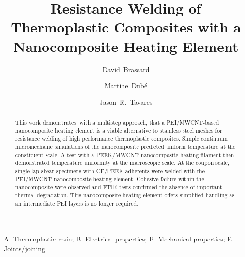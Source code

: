 \documentclass[11pt,review,times]{elsarticle}
\begin{document}


\title{Resistance Welding of Thermoplastic Composites with a Nanocomposite Heating Element}

\author[polymtl,crepec]{David~Brassard}
\author[ets,crepec]{Martine~Dubé}
\author[polymtl,crepec]{Jason~R.~Tavares}


\address[polymtl]{Department of Chemical Engineering, Polytechnique Montréal, P.O. Box 6079 Station Centre-Ville, Montréal, QC, H3C 3A7, Canada}
\address[ets]{Department of Mechanical Engineering, École de technologie supérieure, 1100 Notre-Dame Street West, Montréal, Québec, Canada, H3C 1K3}
\address[crepec]{Research Center for High Performance Polymer and Composite Systems (CREPEC), Polytechnique Montréal, P.O. Box 6079 Station Centre-Ville, Montréal, QC, H3C 3A7, Canada}

\begin{abstract}

This work demonstrates, with a multistep approach, that a PEI/MWCNT-based nanocomposite heating element is a viable alternative to stainless steel meshes for resistance welding of high performance thermoplastic composites. 
Simple continuum micromechanic simulations of the nanocomposite predicted uniform temperature at the constituent scale. 
A test with a PEEK/MWCNT nanocomposite heating filament then demonstrated temperature uniformity at the macroscopic scale. 
At the coupon scale, single lap shear specimens with CF/PEEK adherents were welded with the PEI/MWCNT nanocomposite heating element. 
Cohesive failure within the nanocomposite were observed and FTIR tests confirmed the absence of important thermal degradation. 
This nanocomposite heating element offers simplified handling as an intermediate PEI layers is no longer required. 

\end{abstract}

\begin{keyword}
A. Thermoplastic resin;  B. Electrical properties;  B. Mechanical properties;  E. Joints/joining 
\end{keyword}

\maketitle
\end{document}
